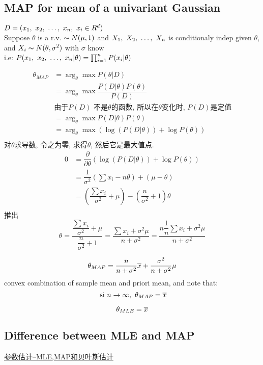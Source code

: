 \documentclass{article}
\begin{document}
\subsection{MAP for mean of a univariant Gaussian}
$D = (x_1,~x_2,~\ldots,~x_n,\ x_i \in R^d)$\\
Suppose $\theta$ is a r.v. $\thicksim{N}(\mu, 1)$ and $X_1,~X_2,~\ldots,~X_n$ is conditionaly indep given $\theta$, 
and $X_i \thicksim{N}(\theta, \sigma^2)$ with $\sigma$ know\\
i.e: $P(x_1,~x_2,~\ldots,~x_n|\theta) = \prod_{i =1}^n P(x_i|\theta)$


$$
\begin{aligned}
\theta_{MAP} 
& = \arg_\theta \max P(\theta | D)\\ 
& = \arg_\theta \max \dfrac{P(D|\theta) P(\theta)}{P(D)}\\ 
& \text{由于$P(D)$ 不是$\theta$的函数, 所以在$\theta$变化时, $P(D)$是定值}\\ 
& = \arg_\theta \max P(D|\theta) P(\theta)\\ 
& = \arg_\theta \max (\log(P(D|\theta)) + \log P(\theta))\\ 
\end{aligned}
$$
对$\theta$求导数, 令之为零, 求得$\theta$, 然后它是最大值点.
$$
\begin{aligned}
0 
& = \dfrac{\partial}{\partial \theta} (\log(P(D|\theta)) + \log P(\theta))\\
& = \dfrac{1}{\sigma^2} (\sum x_i - n \theta) + (\mu - \theta)\\
& = (\dfrac{\sum x_i}{\sigma^2} + \mu) - (\dfrac{n}{\sigma^2} + 1)\theta\\
\end{aligned}
$$
推出
$$
\theta 
= \dfrac{\dfrac{\sum x_i}{\sigma^2} + \mu}{\dfrac{n}{\sigma^2} + 1}
= \dfrac{\sum x_i + \sigma^2 \mu}{n + \sigma^2}
= \dfrac{n \dfrac{1}{n} \sum x_i + \sigma^2 \mu}{n + \sigma^2}
$$

$$ \theta_{MAP} = \dfrac{n}{n + \sigma^2} \overline{x} + \dfrac{\sigma^2}{n + \sigma^2} \mu $$
convex combination of sample mean and priori mean, and note that: 
$$\textrm{\ si } n \to \infty,\ \theta_{MAP} = \overline{x}$$

$$ \theta_{MLE} = \overline{x} $$

\subsection{Difference between MLE and MAP}
\href{http://blog.163.com/silence\_ellen/blog/static/1761042222014413112444364/}{参数估计--MLE,MAP和贝叶斯估计}
\end{document}
